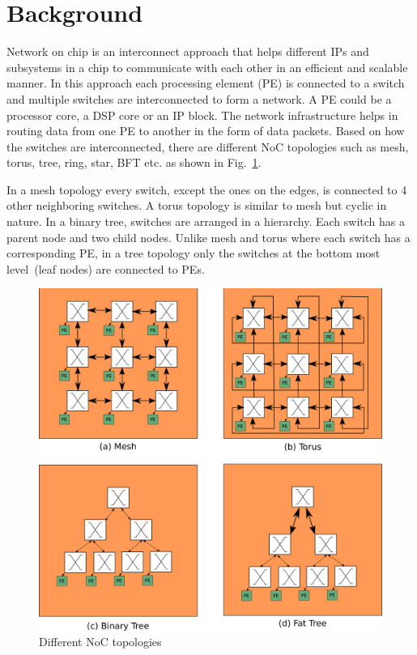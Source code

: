 \section{Background}
\label{sec:background}
Network on chip is an interconnect approach that helps different IPs and subsystems in a chip to communicate with each other in an efficient and scalable manner. 
In this approach each processing element (PE) is connected to a switch and multiple switches are interconnected to form a network.
A PE could be a processor core, a DSP core or an IP block.
The network infrastructure helps in routing data from one PE to another in the form of data packets. 
Based on how the switches are interconnected, there are different NoC topologies such as mesh, torus, tree, ring, star, BFT etc. as shown in Fig.~\ref{fig:topologies}.

In a mesh topology every switch, except the ones on the edges, is connected to 4 other neighboring switches.
A torus topology is similar to mesh but cyclic in nature.
In a binary tree, switches are arranged in a hierarchy.
Each switch has a parent node and two child nodes.
Unlike mesh and torus where each switch has a corresponding PE, in a tree topology only the switches at the bottom most level~(leaf nodes) are connected to PEs.


\begin{figure}[t]
\centering
   \includegraphics[width=\columnwidth]{Figures/topologies.pdf}
   \caption{Different NoC topologies}
   \label{fig:topologies}
\end{figure}

